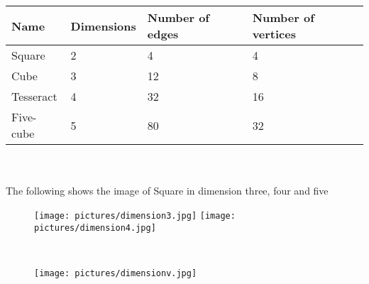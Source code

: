 \documentclass{article}
\begin{document}
\\\\
\begin{tabular}{| l | l | l |l |}
\hline
Name& 	Dimensions& 	Number of edges& 	Number of vertices\\
\hline
Square& 	2& 	4& 	4\\
\hline
Cube& 	3& 	12& 	8\\
\hline
Tesseract& 	4& 	32& 	16\\
\hline
Five-cube& 	5& 	80& 	32\\
\hline
\end{tabular}\\\\
The following shows the image of Square in dimension three, four and five\\
  \begin{figure}[htp]
    \texttt{[image: pictures/dimension3.jpg]}
    \texttt{[image: pictures/dimension4.jpg]}
\end{figure}\\
 \begin{figure}[htp]
     \texttt{[image: pictures/dimensionv.jpg]}
\end{figure}
\end{document}
